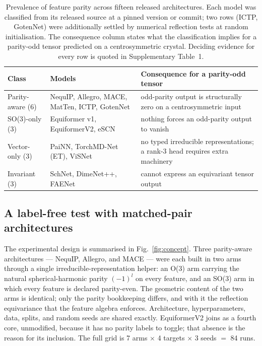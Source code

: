 \begin{table}[t]
\centering
\small
\caption{Prevalence of feature parity across fifteen released architectures. Each model was classified from its released source at a pinned version or commit; two rows (ICTP, GotenNet) were additionally settled by numerical reflection tests at random initialisation. The consequence column states what the classification implies for a parity-odd tensor predicted on a centrosymmetric crystal. Deciding evidence for every row is quoted in Supplementary Table~1.}
\label{tab:audit}
\begin{tabular}{@{}l >{\raggedright\arraybackslash}p{3.7cm} >{\raggedright\arraybackslash}p{5.1cm}@{}}
\toprule
Class & Models & Consequence for a parity-odd tensor \\
\midrule
Parity-aware (6) & NequIP, Allegro, MACE, MatTen, ICTP, GotenNet & odd-parity output is structurally zero on a centrosymmetric input \\
SO(3)-only (3) & Equiformer v1, EquiformerV2, eSCN & nothing forces an odd-parity output to vanish \\
Vector-only (3) & PaiNN, TorchMD-Net (ET), ViSNet & no typed irreducible representations; a rank-3 head requires extra machinery \\
Invariant (3) & SchNet, DimeNet++, FAENet & cannot express an equivariant tensor output \\
\bottomrule
\end{tabular}
\end{table}

\subsection*{A label-free test with matched-pair architectures}

The experimental design is summarised in Fig.~\ref{fig:concept}. Three parity-aware architectures --- NequIP, Allegro, and MACE --- were each built in two arms through a single irreducible-representation helper: an O(3) arm carrying the natural spherical-harmonic parity $(-1)^{l}$ on every feature, and an SO(3) arm in which every feature is declared parity-even. The geometric content of the two arms is identical; only the parity bookkeeping differs, and with it the reflection equivariance that the feature algebra enforces. Architecture, hyperparameters, data, splits, and random seeds are shared exactly. EquiformerV2 joins as a fourth core, unmodified, because it has no parity labels to toggle; that absence is the reason for its inclusion. The full grid is 7 arms $\times$ 4 targets $\times$ 3 seeds $=$ 84 runs.

